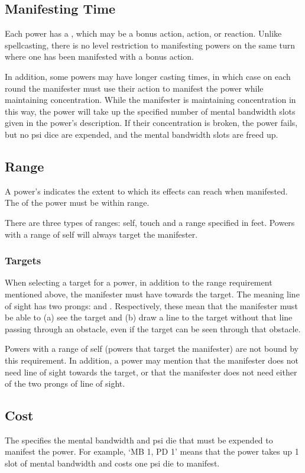 \subsection{Manifesting Time}
Each power has a ,
which may be a bonus action, action, or reaction.
Unlike spellcasting,
there is no level restriction to manifesting powers
on the same turn where one has been manifested
with a bonus action. 

In addition, some powers may have longer casting times,
in which case on each round the manifester must use their action
to manifest the power while maintaining concentration.
While the manifester is maintaining concentration in this way,
the power will take up the specified number
of mental bandwidth slots given in the power's description.
If their concentration is broken, the power fails,
but no psi dice are expended,
and the mental bandwidth slots are freed up.

\subsection{Range}
A power's  indicates the extent
to which its effects can reach when manifested.
The  of the power must be within range.

There are three types of ranges: self, touch and a range
specified in feet.
Powers with a range of self will always target the manifester.

\subsubsection{Targets}
When selecting a target for a power,
in addition to the range requirement mentioned above,
the manifester must have 
towards the target.
The meaning line of sight has two prongs:
 and .
Respectively, these mean that the manifester must be able to
(a) see the target
and (b) draw a line to the target
without that line passing through an obstacle,
even if the target can be seen through that obstacle.

Powers with a range of self (powers that target the manifester)
are not bound by this requirement.
In addition, a power may mention that the manifester does not need
line of sight towards the target,
or that the manifester does not need either of the
two prongs of line of sight. 

\subsection{Cost}
The  specifies the mental bandwidth and psi die
that must be expended to manifest the power.
For example,
`MB 1, PD 1'
means that the power takes up 1 slot of mental bandwidth
and costs one psi die to manifest.

